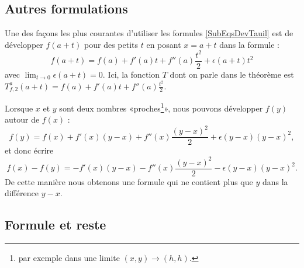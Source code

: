 \subsection{Autres formulations}

\begin{example}		\label{ExempleUtlDev}
	Une des façons les plus courantes d'utiliser les formules \eqref{SubEqsDevTauil} est de développer \( f(a+t)\) pour des petits \( t\) en posant \( x=a+t\) dans la formule :
	\begin{equation}	\label{EqDevfautouraeps}
		f(a+t)=f(a)+f'(a)t+f''(a)\frac{ t^2 }{ 2 }+\epsilon(a+t)t^2
	\end{equation}
	avec \( \lim_{t\to 0} \epsilon(a+t)=0\). Ici, la fonction \( T\) dont on parle dans le théorème est \( T_{f,2}^a(a+t)=f(a)+f'(a)t+f''(a)\frac{ t^2 }{2}\).

	Lorsque \( x\) et \( y\) sont deux nombres «proches\footnote{par exemple dans une limite \( (x,y)\to(h,h)\).}», nous pouvons développer \( f(y)\) autour de \( f(x)\) :
	\begin{equation}		\label{Eqfydevfx}
		f(y)=f(x)+f'(x)(y-x)+f''(x)\frac{ (y-x)^2 }{ 2 }+\epsilon(y-x)(y-x)^2,
	\end{equation}
	et donc écrire
	\begin{equation}
		f(x)-f(y)=-f'(x)(y-x)-f''(x)\frac{ (y-x)^2 }{ 2 }-\epsilon(y-x)(y-x)^2.
	\end{equation}
	De cette manière nous obtenons une formule qui ne contient plus que \( y\) dans la différence \( y-x\).
\end{example}

\subsection{Formule et reste}

